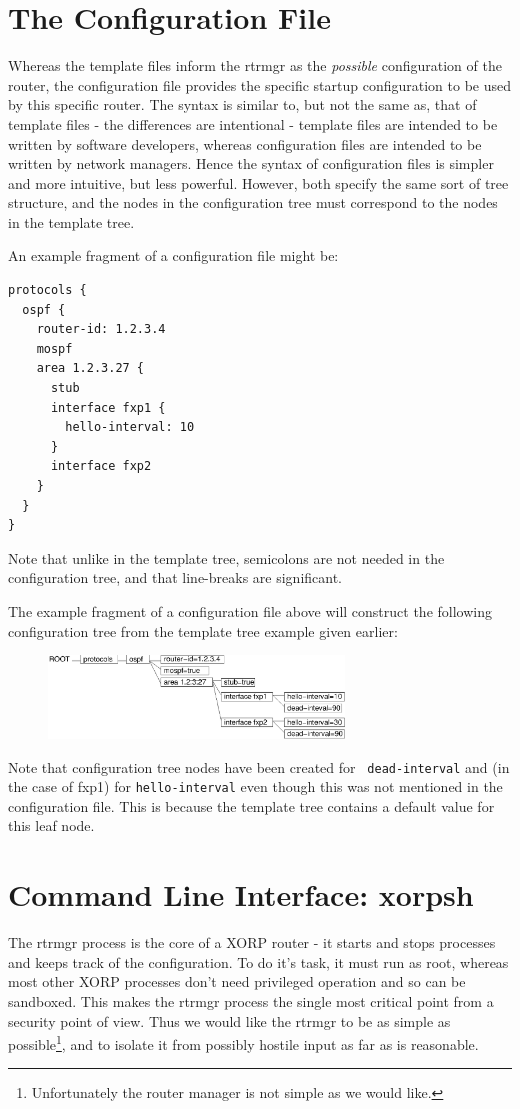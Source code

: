 \documentclass[11pt]{article}
\begin{document}
\section{The Configuration File}
Whereas the template files inform the rtrmgr as the {\it possible}
configuration of the router, the configuration file provides the
specific startup configuration to be used by this specific router.
The syntax is similar to, but not the same as, that of template files -
the differences are intentional - template files are intended to be
written by software developers, whereas configuration files are
intended to be written by network managers.  Hence the syntax of
configuration files is simpler and more intuitive, but less powerful.
However, both specify the same sort of tree structure, and the nodes
in the configuration tree must correspond to the nodes in the template
tree.

An example fragment of a configuration file might be:
\begin{verbatim}
protocols {
  ospf {
    router-id: 1.2.3.4
    mospf
    area 1.2.3.27 {
      stub
      interface fxp1 {
        hello-interval: 10
      }
      interface fxp2
    }
  }
}
\end{verbatim}
Note that unlike in the template tree, semicolons are not needed in the
configuration tree, and that line-breaks are significant.

The example fragment of a configuration file above will construct the
following configuration tree from the template tree example given
earlier:
\begin{figure}[htb]
\centerline{\includegraphics[width=0.7\textwidth]{figs/config}}
\vspace{.05in}
\end{figure}

Note that configuration tree nodes have been created for {\tt
dead-interval} and (in the case of fxp1) for {\tt hello-interval} even
though this was not mentioned in the configuration file.  This is
because the template tree contains a default value for this leaf node.
\newpage
\section{Command Line Interface: xorpsh}
The rtrmgr process is the core of a XORP router - it starts and stops
processes and keeps track of the configuration.  To do it's task, it
must run as root, whereas most other XORP processes don't need
privileged operation and so can be sandboxed.  This makes the rtrmgr
process the single most critical point from a security point of view.
Thus we would like the rtrmgr to be as simple as
possible\footnote{Unfortunately the router manager is not simple as we
would like.}, and to isolate it from possibly hostile input as far as
is reasonable.
\end{document}
